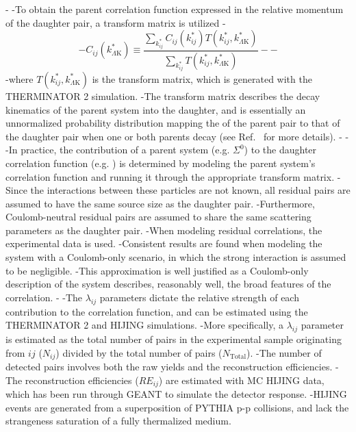 -
-To obtain the parent correlation function expressed in the relative momentum of the daughter pair, a transform matrix is utilized
-\begin{equation}
-  C_{ij}(k^{*}_{\Lambda\mathrm{K}}) \equiv \frac{\sum\limits_{k^{*}_{ij}} C_{ij}\left(k^{*}_{ij}\right) T\left(k^{*}_{ij},k^{*}_{\Lambda\mathrm{K}}\right)}{\sum\limits_{k^{*}_{ij}} T\left(k^{*}_{ij},k^{*}_{\Lambda\mathrm{K}}\right)}
-\label{eqn:ResidualsTransform}
-\end{equation}
-where $T(k^{*}_{ij},k^{*}_{\Lambda\mathrm{K}})$ is the transform matrix, which is generated with the THERMINATOR 2 \cite{Chojnacki:2011hb} simulation. 
-The transform matrix describes the decay kinematics of the parent system into the daughter, and is essentially an unnormalized probability distribution mapping the \kstar of the parent pair to that of the daughter pair when one or both parents decay (see Ref.\ \cite{Kisiel:2014mma} for more details).
-
-
-In practice, the contribution of a parent system (e.g. $\Sigma^{0}$\KchP) to the daughter correlation function (e.g. \LamKchP) is determined by modeling the parent system's correlation function and running it through the appropriate transform matrix.
-Since the interactions between these particles are not known, all residual pairs are assumed to have the same source size as the daughter pair.
-Furthermore, Coulomb-neutral residual pairs are assumed to share the same scattering parameters as the \LamK daughter pair.
-When modeling \XiKpm residual correlations, the experimental \XiKpm data is used. 
-Consistent results are found when modeling the \XiKpm system with a Coulomb-only scenario, in which the strong interaction is assumed to be negligible.
-This approximation is well justified as a Coulomb-only description of the system describes, reasonably well, the broad features of the \XiKpm correlation.   
-
-The $\lambda_{ij}$ parameters dictate the relative strength of each contribution to the correlation function, and can be estimated using the THERMINATOR 2 and HIJING simulations.
-More specifically, a $\lambda_{ij}$ parameter is estimated as the total number of \LamK pairs in the experimental sample originating from $ij$ ($N_{ij}$) divided by the total number of \LamK pairs ($N_{\mathrm{Total}}$).
-The number of detected \LamK pairs involves both the raw yields and the reconstruction efficiencies.
-The reconstruction efficiencies ($RE_{ij}$) are estimated with MC HIJING data, which has been run through GEANT to simulate the detector response.
-HIJING events are generated from a superposition of PYTHIA p-p collisions, and lack the strangeness saturation of a fully thermalized medium.
